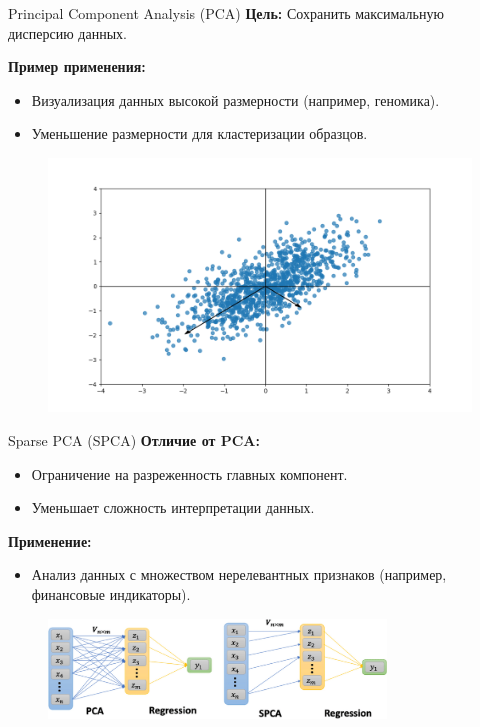 \begin{frame}{Principal Component Analysis (PCA)}
    \textbf{Цель:} Сохранить максимальную дисперсию данных.

    \textbf{Пример применения:}
    \begin{itemize}
        \item Визуализация данных высокой размерности (например, геномика).
        \item Уменьшение размерности для кластеризации образцов.
    \end{itemize}

    \begin{figure}
        \centering
        \includegraphics[width=.55\textwidth]{../resources/methods/pca.png}
    \end{figure}

\end{frame}

\begin{frame}{Sparse PCA (SPCA)}
    \textbf{Отличие от PCA:}
    \begin{itemize}
        \item Ограничение на разреженность главных компонент.
        \item Уменьшает сложность интерпретации данных.
    \end{itemize}

    \textbf{Применение:}
    \begin{itemize}
        \item Анализ данных с множеством нерелевантных признаков (например, финансовые индикаторы).
    \end{itemize}

    \begin{figure}
        \includegraphics[width=0.8\textwidth]{../resources/methods/pca_spca.png}
    \end{figure}
\end{frame}

